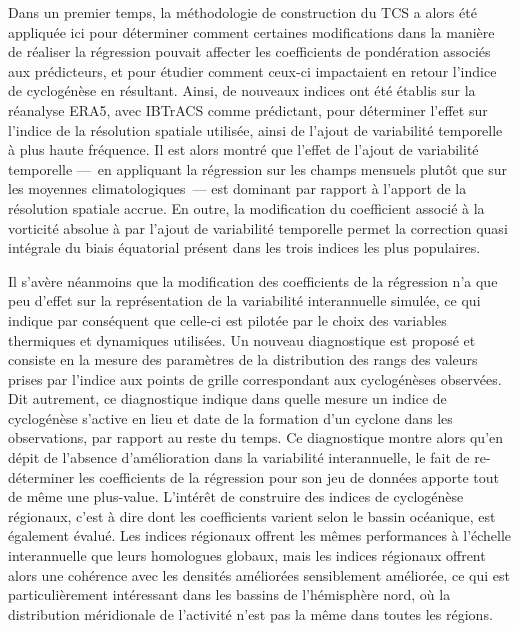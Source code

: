 \documentclass[../main.tex]{subfiles}
\begin{document}
Dans un premier temps, la méthodologie de construction du TCS a alors été appliquée ici pour déterminer comment certaines modifications dans la manière de
réaliser la régression pouvait affecter les coefficients de pondération associés aux prédicteurs, et pour étudier comment ceux-ci impactaient en retour l'indice
de cyclogénèse en résultant. Ainsi, de nouveaux indices ont été établis sur la réanalyse ERA5, avec IBTrACS comme prédictant, pour déterminer l'effet sur
l'indice de la résolution spatiale utilisée, ainsi de l'ajout de variabilité temporelle à plus haute fréquence. Il est alors montré que l'effet de l'ajout de
variabilité temporelle ---~en appliquant la régression sur les champs mensuels plutôt que sur les moyennes climatologiques~--- est dominant par rapport à
l'apport de la résolution spatiale accrue. En outre, la modification du coefficient associé à la vorticité absolue à  par l'ajout de variabilité
temporelle permet la correction quasi intégrale du biais équatorial présent dans les trois indices les plus populaires.

Il s'avère néanmoins que la modification des coefficients de la régression n'a que peu d'effet sur la représentation de la variabilité interannuelle simulée, ce
qui indique par conséquent que celle-ci est pilotée par le choix des variables thermiques et dynamiques utilisées. Un nouveau diagnostique est proposé et
consiste en la mesure des paramètres de la distribution des rangs des valeurs prises par l'indice aux points de grille correspondant aux cyclogénèses observées.
Dit autrement, ce diagnostique indique dans quelle mesure un indice de cyclogénèse s'active en lieu et date de la formation d'un cyclone dans les observations,
par rapport au reste du temps. Ce diagnostique montre alors qu'en dépit de l'absence d'amélioration dans la variabilité interannuelle, le fait de re-déterminer
les coefficients de la régression pour son jeu de données apporte tout de même une plus-value. L'intérêt de construire des indices de cyclogénèse régionaux,
c'est à dire dont les coefficients varient selon le bassin océanique, est également évalué. Les indices régionaux offrent les mêmes performances à l'échelle
interannuelle que leurs homologues globaux, mais les indices régionaux offrent alors une cohérence avec les densités améliorées sensiblement améliorée, ce qui
est particulièrement intéressant dans les bassins de l'hémisphère nord, où la distribution méridionale de l'activité n'est pas la même dans toutes les régions.
\end{document}
